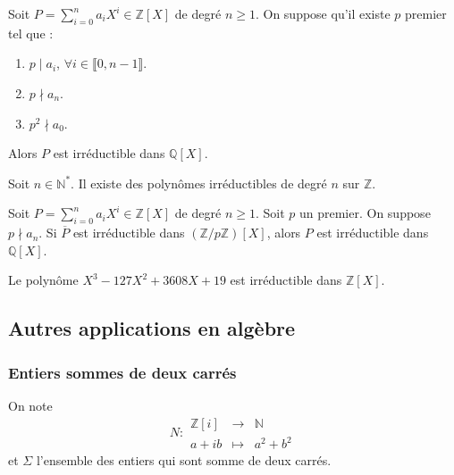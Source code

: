 	
	\begin{theorem}
		Soit $P = \sum_{i=0}^n a_i X^i \in \mathbb{Z}[X]$ de degré $n \geq 1$. On suppose qu'il existe $p$ premier tel que :
		\begin{enumerate}[label=(\roman*)]
			\item $p \mid a_i$, $\forall i \in \llbracket 0, n-1 \rrbracket$.
			\item $p \nmid a_n$.
			\item $p^2 \nmid a_0$.
		\end{enumerate}
		Alors $P$ est irréductible dans $\mathbb{Q}[X]$.
	\end{theorem}
	
	
	\begin{application}
		Soit $n \in \mathbb{N}^*$. Il existe des polynômes irréductibles de degré $n$ sur $\mathbb{Z}$.
	\end{application}
	
	
	\begin{theorem}
		Soit $P = \sum_{i=0}^n a_i X^i \in \mathbb{Z}[X]$ de degré $n \geq 1$. Soit $p$ un premier. On suppose $p \nmid a_n$.
		\newpar
		Si $\overline{P}$ est irréductible dans $(\mathbb{Z}/p\mathbb{Z})[X]$, alors $P$ est irréductible dans $\mathbb{Q}[X]$.
	\end{theorem}
	
	\begin{example}
		Le polynôme $X^3-127X^2+3608X+19$ est irréductible dans $\mathbb{Z}[X]$.
	\end{example}
	
	\subsection{Autres applications en algèbre}
	
	\subsubsection{Entiers sommes de deux carrés}
	
	
	\begin{notation}
		On note \[ N :
		\begin{array}{ccc}
			\mathbb{Z}[i] &\rightarrow& \mathbb{N} \\
			a+ib &\mapsto& a^2 + b^2
		\end{array}
		\] et $\Sigma$ l'ensemble des entiers qui sont somme de deux carrés.
	\end{notation}
	
